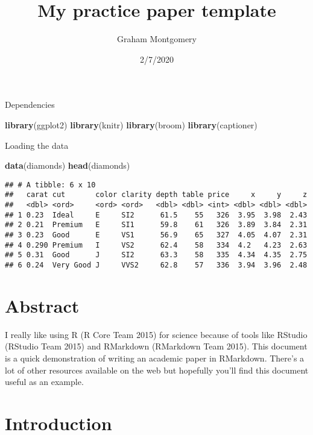 \documentclass[
]{article}
\title{My practice paper template}
\author{Graham Montgomery}
\date{2/7/2020}
\newenvironment{Shaded}{\begin{snugshade}}{\end{snugshade}}
\newcommand{\KeywordTok}[1]{\textcolor[rgb]{0.13,0.29,0.53}{\textbf{#1}}}
\newcommand{\NormalTok}[1]{#1}
\begin{document}
\maketitle

Dependencies

\begin{Shaded}
\begin{Highlighting}[]
  \KeywordTok{library}\NormalTok{(ggplot2)}
  \KeywordTok{library}\NormalTok{(knitr)}
  \KeywordTok{library}\NormalTok{(broom)}
  \KeywordTok{library}\NormalTok{(captioner)}
\end{Highlighting}
\end{Shaded}

Loading the data

\begin{Shaded}
\begin{Highlighting}[]
\KeywordTok{data}\NormalTok{(diamonds)}
\KeywordTok{head}\NormalTok{(diamonds)}
\end{Highlighting}
\end{Shaded}

\begin{verbatim}
## # A tibble: 6 x 10
##   carat cut       color clarity depth table price     x     y     z
##   <dbl> <ord>     <ord> <ord>   <dbl> <dbl> <int> <dbl> <dbl> <dbl>
## 1 0.23  Ideal     E     SI2      61.5    55   326  3.95  3.98  2.43
## 2 0.21  Premium   E     SI1      59.8    61   326  3.89  3.84  2.31
## 3 0.23  Good      E     VS1      56.9    65   327  4.05  4.07  2.31
## 4 0.290 Premium   I     VS2      62.4    58   334  4.2   4.23  2.63
## 5 0.31  Good      J     SI2      63.3    58   335  4.34  4.35  2.75
## 6 0.24  Very Good J     VVS2     62.8    57   336  3.94  3.96  2.48
\end{verbatim}

\hypertarget{abstract}{%
\section{Abstract}\label{abstract}}

I really like using R (R Core Team 2015) for science because of tools
like RStudio (RStudio Team 2015) and RMarkdown (RMarkdown Team 2015).
This document is a quick demonstration of writing an academic paper in
RMarkdown. There's a lot of other resources available on the web but
hopefully you'll find this document useful as an example.

\hypertarget{introduction}{%
\section{Introduction}\label{introduction}}
\end{document}
